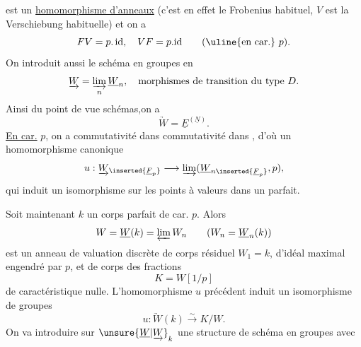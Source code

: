
est un \uline{homomorphisme d'anneaux} (c'est en effet le Frobenius habituel\deleted{\unsure{)}},
$V$ est la Verschiebung habituelle) et on a
\[
FV=p.\,\mathrm{id},\quad VF=p.\mathrm{id}\qquad(\text{\uline{en car.} }p).
\]
On introduit aussi le schéma en groupes en
\[
\underrightarrow{W}=\varinjlim_n\underline{W}_n,\quad\text{morphismes de transition du type }D.
\]
Ainsi du point de vue schémas,on a
\[
\underrightarrow{W}=\underline{E}^{(\underline{N})}.
\]
\uline{En car.} $p$, on a commutativité dans
 commutativité dans
,
d'où un homomorphisme canonique
\[
u:\underrightarrow{W}_{\inserted{\underline{F}_p}}\longrightarrow
\varinjlim(\underline{W}_{n\inserted{\underline{F}_p}},p),
\]
qui  induit un isomorphisme sur les points à valeurs dans un  parfait.

Soit maintenant $k$ un corps parfait de car. $p$. Alors
\[
W=\underline{W}(k)=\varprojlim W_n\qquad(W_n=\underline{W}_n(k))
\]
est un anneau de valuation discrète de corps résiduel  $W_1=k$, d'idéal maximal engendré par $p$, et de corps des fractions
\[
K=W[1/p]
\]
de caractéristique nulle. L'homomorphisme $u$ précédent induit un isomorphisme de groupes
\[
u:\underrightarrow{W}(k)\xrightarrow{\sim}K/W.
\]
On va introduire sur $\unsure{\underline{W}|\underrightarrow{W}}_k$ une structure de schéma en groupes avec

